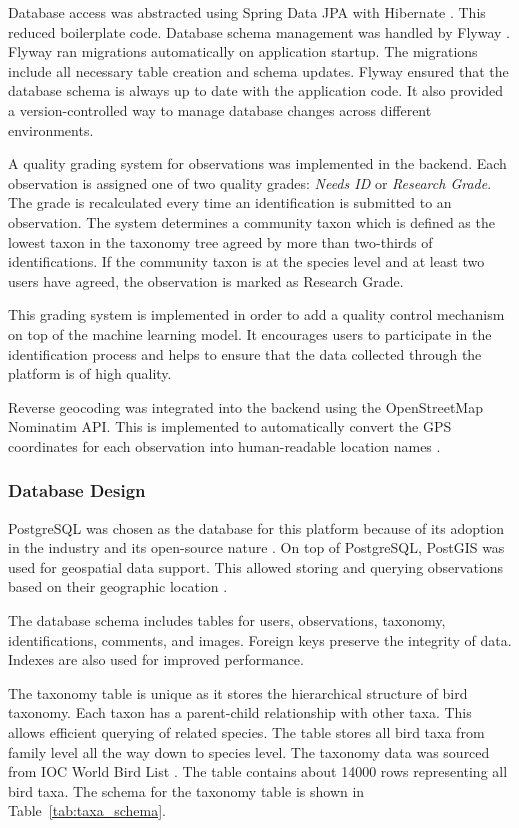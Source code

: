 Database access was abstracted using Spring Data JPA with Hibernate \cite{tudose2021orm}. This reduced 
boilerplate code. Database schema management was handled by Flyway \cite{flyway2025}. Flyway ran migrations 
automatically on application startup. The migrations include all necessary table creation and schema updates.
Flyway ensured that the database schema is always up to date with the application code. It also provided a version-controlled 
way to manage database changes across different environments.

A quality grading system for observations was implemented in the backend. Each observation 
is assigned one of two quality grades: \textit{Needs ID} or \textit{Research Grade}. 
The grade is recalculated every time an identification is submitted to an observation.
The system determines a community taxon which is defined as the lowest taxon in the taxonomy 
tree agreed by more than two-thirds of identifications. If the community taxon is at 
the species level and at least two users have agreed, the observation is marked as Research Grade.

This grading system is implemented in order to add a quality control mechanism on top of the
machine learning model. It encourages users to participate in the identification 
process and helps to ensure that the data collected through the platform is of high quality.

Reverse geocoding was integrated into the backend using the OpenStreetMap Nominatim API. This is
implemented to automatically convert the GPS coordinates for each observation into human-readable
location names \cite{nominatim2025}.

\subsubsection{Database Design}

PostgreSQL was chosen as the database for this platform because of its adoption in the industry and its
open-source nature \cite{postgresql2025}. On top of PostgreSQL, PostGIS was used for geospatial data support. 
This allowed storing and querying observations based on their geographic location \cite{postgis2025}.

The database schema includes tables for users, observations, taxonomy, identifications, comments, and images.
Foreign keys preserve the integrity of data. Indexes are also used for improved performance.

The taxonomy table is unique as it stores the hierarchical structure of bird taxonomy. 
Each taxon has a parent-child relationship with other taxa. This allows efficient querying of related species.
The table stores all bird taxa from family level all the way down to species level. The taxonomy data was sourced
from IOC World Bird List \cite{ioc2025}. The table contains about 14000 rows representing all bird taxa.
The schema for the taxonomy table is shown in Table~\ref{tab:taxa_schema}.

